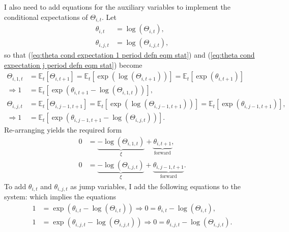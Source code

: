 \documentclass[12 pt, oneside]{article}
\theoremstyle{definition}
\theoremstyle{definition}
\theoremstyle{definition}
\newcommand{\E}{\mathbb{E}}
\begin{document}
I also need to add equations for the auxiliary variables to implement the conditional expectations of $\Theta_{i, t}$. Let
\begin{align}
\theta_{i, t} & = \log(\Theta_{i, t}),\\
\theta_{i, j, t} & = \log(\Theta_{i, j, t}),
\end{align}
so that (\ref{eq:theta cond expectation 1 period defn eqm stat}) and (\ref{eq:theta cond expectation j period defn eqm stat}) become
\begin{align*}
  \Theta_{i, 1, t} & = \E_t\left[\Theta_{i, t + 1}\right] = \E_t\left[\exp(\log(\Theta_{i, t + 1}))\right] = \E_t[\exp(\theta_{i, t + 1})]\\
  \Rightarrow 1 & = \E_t\left[\exp\left(\theta_{i, t + 1} - \log(\Theta_{i, 1, t})\right)\right],\\
  \Theta_{i, j, t} & = \E_t\left[\Theta_{i, j - 1, t + 1}\right] = \E_t\left[\exp(\log(\Theta_{i, j - 1, t + 1}))\right] = \E_t[\exp(\theta_{i, j - 1, t + 1})],\\
  \Rightarrow 1 & = \E_t\left[\exp\left(\theta_{i, j - 1, t + 1} - \log(\Theta_{i, j, t})\right)\right].
\end{align*}
Re-arranging yields the required form
\begin{align*}
  0 & = \underbrace{-\log(\Theta_{i, 1, t})}_{\xi} + \underbrace{\theta_{i, t + 1}}_{\text{forward}},\\
  0 & = \underbrace{-\log(\Theta_{i, j, t})}_{\xi} + \underbrace{\theta_{i, j - 1, t + 1}}_{\text{forward}}.
\end{align*}
To add $\theta_{i, t}$ and $\theta_{i, j, t}$ as jump variables, I add the following equations to the system:
which implies the equations
\begin{align*}
  1 & = \exp(\theta_{i, t} - \log(\Theta_{i, t})) \Rightarrow 0 = \theta_{i, t} - \log(\Theta_{i, t}),\\
  1 & = \exp(\theta_{i, j, t} - \log(\Theta_{i, j, t})) \Rightarrow 0 = \theta_{i, j, t} - \log(\Theta_{i, j, t}).
\end{align*}
\end{document}
